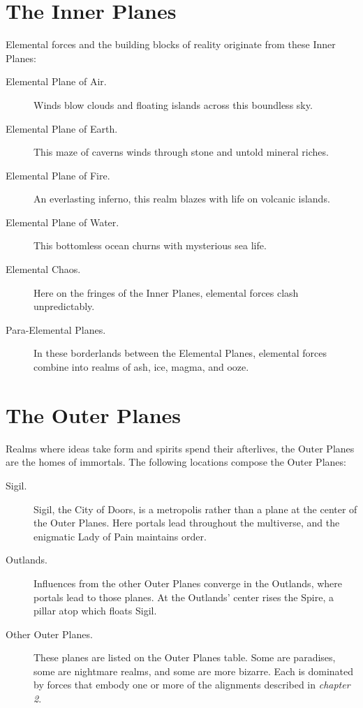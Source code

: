 \documentclass[10pt,a4paper,twoside,bg=print,twocolumn,openany,nodeprecatedcode]{dndbook}
\begin{document}
\section{The Inner Planes}
Elemental forces and the building blocks of reality originate from these Inner Planes:


\begin{description}
\item[Elemental Plane of Air.]
Winds blow clouds and floating islands across this boundless sky.
\item[Elemental Plane of Earth.]
This maze of caverns winds through stone and untold mineral riches.
\item[Elemental Plane of Fire.]
An everlasting inferno, this realm blazes with life on volcanic islands.
\item[Elemental Plane of Water.]
This bottomless ocean churns with mysterious sea life.
\item[Elemental Chaos.]
Here on the fringes of the Inner Planes, elemental forces clash unpredictably.
\item[Para-Elemental Planes.]
In these borderlands between the Elemental Planes, elemental forces combine into realms of ash, ice, magma, and ooze.
\end{description}

\section{The Outer Planes}
Realms where ideas take form and spirits spend their afterlives, the Outer Planes are the homes of immortals. The following locations compose the Outer Planes:


\begin{description}
\item[Sigil.]
Sigil, the City of Doors, is a metropolis rather than a plane at the center of the Outer Planes. Here portals lead throughout the multiverse, and the enigmatic Lady of Pain maintains order.
\item[Outlands.]
Influences from the other Outer Planes converge in the Outlands, where portals lead to those planes. At the Outlands' center rises the Spire, a pillar atop which floats Sigil.
\item[Other Outer Planes.]
These planes are listed on the Outer Planes table. Some are paradises, some are nightmare realms, and some are more bizarre. Each is dominated by forces that embody one or more of the alignments described in \textit{chapter 2}.
\end{description}
\end{document}
